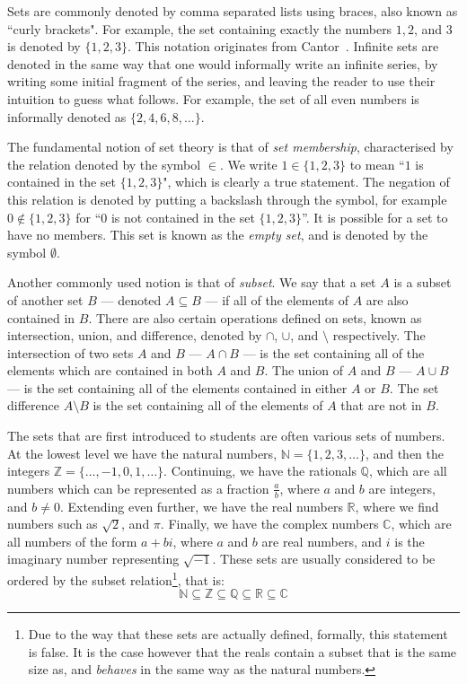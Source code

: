 \documentclass[11pt]{report}
\theoremstyle{definition}
\theoremstyle{theorem}
\theoremstyle{lemma}
\begin{document}
Sets are commonly denoted by comma separated lists using braces, also known as ``curly brackets". 
For example, the set containing exactly the numbers $1,2$, and $3$ is denoted by $\{1,2,3\}$. 
This notation originates from Cantor~\cite{cantor}.
Infinite sets are denoted in the same way that one would informally write an infinite series, by writing some initial fragment of the series, and leaving the reader to use their intuition to guess what follows. 
For example, the set of all even numbers is informally denoted as $\{2,4,6,8,\ldots\}$.  

The fundamental notion of set theory is that of \emph{set membership}, characterised by the relation denoted by the symbol $\in$.
We write $1\in\{1,2,3\}$ to mean ``$1$ is contained in the set $\{1,2,3\}$", which is clearly a true statement. 
The negation of this relation is denoted by putting a backslash through the symbol, for example $0\notin\{1,2,3\}$ for ``$0$ is not contained in the set $\{1,2,3\}$''.
It is possible for a set to have no members.
This set is known as the \emph{empty set}, and is denoted by the symbol $\emptyset$. 

Another commonly used notion is that of \emph{subset}.
We say that a set $A$ is a subset of another set $B$ --- denoted $A \subseteq B$ --- if all of the elements of $A$ are also contained in $B$.
There are also certain operations defined on sets, known as intersection, union, and difference, denoted by $\cap$, $\cup$, and $\setminus$ respectively.
The intersection of two sets $A$ and $B$ --- $A\cap B$ --- is the set containing all of the elements which are contained in both $A$ and $B$.
The union of $A$ and $B$ --- $A\cup B$ --- is the set containing all of the elements contained in either $A$ or $B$. 
The set difference $A\setminus B$ is the set containing all of the elements of $A$ that are not in $B$.

The sets that are first introduced to students are often various sets of numbers.
At the lowest level we have the natural numbers, $\mathbb{N} = \{1,2,3,\ldots\}$, and then the integers $\mathbb{Z} = \{\ldots, -1, 0, 1, \ldots\}$.
Continuing, we have the rationals $\mathbb{Q}$, which are all numbers which can be represented as a fraction $\frac{a}{b}$, where $a$ and $b$ are integers, and $b\neq 0$.
Extending even further, we have the real numbers $\mathbb{R}$, where we find numbers such as $\sqrt{2}$, and $\pi$. 
Finally, we have the complex numbers $\mathbb{C}$, which are all numbers of the form $a+bi$, where $a$ and $b$ are real numbers, and $i$ is the imaginary number representing $\sqrt{-1}$.
These sets are usually considered to be ordered by the subset relation\footnote{Due to the way that these sets are actually defined, formally, this statement is false. It is the case however that the reals contain a subset that is the same size as, and \emph{behaves} in the same way as the natural numbers.}, that is: 
$$\mathbb{N} \subseteq \mathbb{Z} \subseteq \mathbb{Q} \subseteq \mathbb{R} \subseteq \mathbb{C}$$
\end{document}
